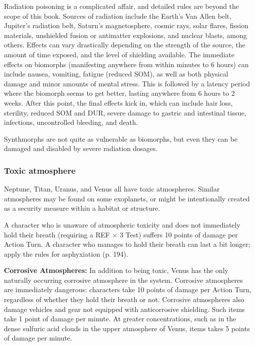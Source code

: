 Radiation poisoning is a complicated affair, and detailed rules are beyond the scope of this book. Sources of radiation include the Earth’s Van Allen belt, Jupiter’s radiation belt, Saturn’s magnetosphere, cosmic rays, solar flares, fission materials, unshielded fusion or antimatter explosions, and nuclear blasts, among others. Effects can vary drastically depending on the strength of the source, the amount of time exposed, and the level of shielding available. The immediate effects on biomorphs (manifesting anywhere from within minutes to 6 hours) can include nausea, vomiting, fatigue (reduced SOM), as well as both physical damage and minor amounts of mental stress. This is followed by a latency period where the biomorph seems to get better, lasting anywhere from 6 hours to 2 weeks. After this point, the final effects kick in, which can include hair loss, sterility, reduced SOM and DUR, severe damage to gastric and intestinal tissue, infections, uncontrolled bleeding, and death.

Synthmorphs are not quite as vulnerable as biomorphs, but even they can be damaged and disabled by severe radiation dosages.

\subsubsection{Toxic atmosphere}

Neptune, Titan, Uranus, and Venus all have toxic atmospheres. Similar atmospheres may be found on some exoplanets, or might be intentionally created as a security measure within a habitat or structure.

A character who is unaware of atmospheric toxicity and does not immediately hold their breath (requiring a REF $\times$ 3 Test) suffers 10 points of damage per Action Turn. A character who manages to hold their breath can last a bit longer; apply the rules for asphyxiation (p. 194).

\textbf{Corrosive Atmospheres:} In addition to being toxic, Venus has the only naturally occurring corrosive atmosphere in the system. Corrosive atmospheres are immediately dangerous: characters take 10 points of damage per Action Turn, regardless of whether they hold their breath or not. Corrosive atmospheres also damage vehicles and gear not equipped with anticorrosive shielding. Such items take 1 point of damage per minute. At greater concentrations, such as in the dense sulfuric acid clouds in the upper atmosphere of Venus, items takes 5 points of damage per minute.

